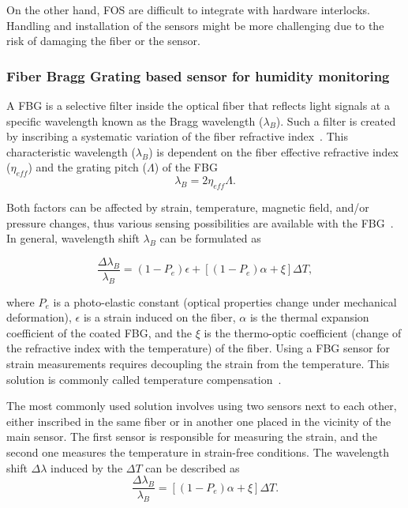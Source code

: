 On the other hand, \gls{FOS} are difficult to integrate with hardware interlocks. Handling and installation of the sensors might be more challenging due to the risk of damaging the fiber or the sensor. 




\subsubsection{Fiber Bragg Grating based sensor for humidity monitoring }
\label{fbg}
A FBG is a selective filter inside the optical fiber that reflects light signals at a specific wavelength known as the Bragg wavelength ($\lambda_{B}$). Such a filter is created by inscribing a systematic variation of the fiber refractive index~\cite{fbg_overview}. This characteristic wavelength ($\lambda_{B}$) is dependent on the fiber effective refractive index ($\eta_{eff}$) and the grating pitch ($\Lambda$) of the \gls{FBG}~\cite{Othonos2000FiberBG}
\begin{equation}
    \lambda_{B} = 2 \eta_{eff} \Lambda.
\end{equation}

Both factors can be affected by strain, temperature, magnetic field, and/or pressure changes, thus various sensing possibilities are available with the FBG~\cite{Yun-Jiang_Rao_1997}. In general, wavelength shift $\lambda_{B}$ can be formulated as

\begin{equation}
    \frac{\Delta\lambda_{B}}{\lambda_{B}}=(1-P_{e}) \epsilon + \left [(1-P_{e}) \alpha + \xi  \right ] \Delta T,
\end{equation}

where $P_{e}$ is a photo-elastic constant (optical properties change under mechanical deformation), $\epsilon$ is a strain induced on the fiber, $\alpha$ is the thermal expansion coefficient of the coated \gls{FBG}, and the $\xi$ is the thermo-optic coefficient (change of the refractive index with the temperature) of the fiber. Using a \gls{FBG} sensor for strain measurements requires decoupling the strain from the temperature. This solution is commonly called temperature compensation~\cite{Yun-Jiang_Rao_1997}. 

The most commonly used solution involves using two sensors next to each other, either inscribed in the same fiber or in another one placed in the vicinity of the main sensor. The first sensor is responsible for measuring the strain, and the second one measures the temperature in strain-free conditions. The wavelength shift $\Delta \lambda$ induced by the $\Delta T$ can be described as
\begin{equation}
    \frac{\Delta\lambda_{B}}{\lambda_{B}}=\left [(1-P_{e}) \alpha + \xi  \right ] \Delta T.
\end{equation}


